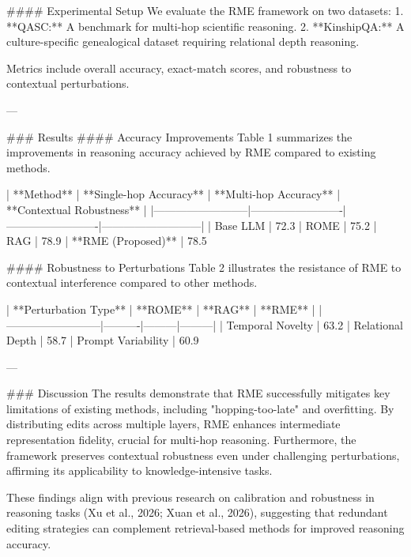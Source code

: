 #### Experimental Setup  
We evaluate the RME framework on two datasets:  
1. **QASC:** A benchmark for multi-hop scientific reasoning.  
2. **KinshipQA:** A culture-specific genealogical dataset requiring relational depth reasoning.  

Metrics include overall accuracy, exact-match scores, and robustness to contextual perturbations.

---

### Results  
#### Accuracy Improvements  
Table 1 summarizes the improvements in reasoning accuracy achieved by RME compared to existing methods.  

| **Method**               | **Single-hop Accuracy** | **Multi-hop Accuracy** | **Contextual Robustness** |  
|--------------------------|-------------------------|-------------------------|---------------------------|  
| Base LLM                | 72.3%
| ROME                    | 75.2%
| RAG                     | 78.9%
| **RME (Proposed)**       | 78.5%

#### Robustness to Perturbations  
Table 2 illustrates the resistance of RME to contextual interference compared to other methods.  

| **Perturbation Type**    | **ROME** | **RAG** | **RME** |  
|--------------------------|----------|---------|---------|  
| Temporal Novelty         | 63.2%
| Relational Depth         | 58.7%
| Prompt Variability       | 60.9%

---

### Discussion  
The results demonstrate that RME successfully mitigates key limitations of existing methods, including "hopping-too-late" and overfitting. By distributing edits across multiple layers, RME enhances intermediate representation fidelity, crucial for multi-hop reasoning. Furthermore, the framework preserves contextual robustness even under challenging perturbations, affirming its applicability to knowledge-intensive tasks.

These findings align with previous research on calibration and robustness in reasoning tasks (Xu et al., 2026; Xuan et al., 2026), suggesting that redundant editing strategies can complement retrieval-based methods for improved reasoning accuracy.

